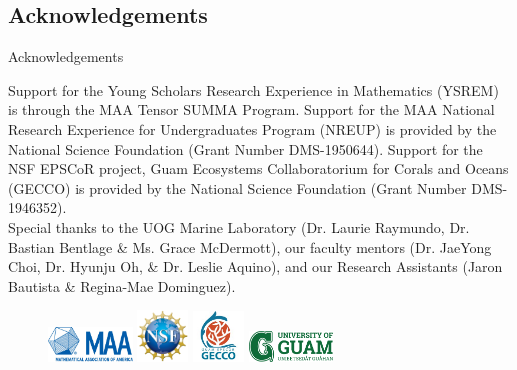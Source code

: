 \documentclass{beamer}
\begin{document}
\subsection{Acknowledgements}
\begin{frame}{Acknowledgements}
    \begin{center}
        Support for the Young Scholars Research Experience in Mathematics (YSREM)  is through the MAA Tensor SUMMA Program. Support for the MAA National Research Experience for Undergraduates Program (NREUP) is provided by the National Science Foundation (Grant Number DMS-1950644). Support for the NSF EPSCoR project, Guam Ecosystems Collaboratorium for Corals and Oceans (GECCO) is provided by the National Science Foundation (Grant Number DMS-1946352). \\
    \vspace{.2cm}
    \small{Special thanks to the UOG Marine Laboratory (Dr. Laurie Raymundo, Dr. Bastian Bentlage \& Ms. Grace McDermott), our faculty mentors (Dr. JaeYong Choi, Dr. Hyunju Oh, \& Dr. Leslie Aquino), and our Research Assistants (Jaron Bautista \& Regina-Mae Dominguez).}
    
    \begin{figure}
        \includegraphics[width = 0.20\textwidth]{Figures/MAA_logo_PMS286.jpg}
        \label{MAA}
        \includegraphics[width = 0.12\textwidth]{Figures/NSF_4-Color_bitmap_Logo.png}
        \label{NSF}
        \includegraphics[width = 0.12\textwidth]{Figures/epscor.jpeg}
        \label{epscor}
        \includegraphics[width = 0.20\textwidth]{Figures/UOG-horizontal.png}
        \label{uog}
    \end{figure}
    \end{center}
\end{frame}
\end{document}
